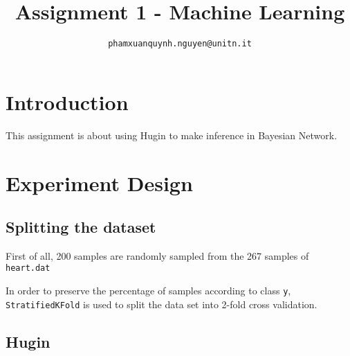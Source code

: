 \documentclass[conference]{IEEEtran}
\begin{document}
\title{Assignment 1 - Machine Learning}

\author{
	\texttt{phamxuanquynh.nguyen@unitn.it}
}

\maketitle

\acresetall

\section{Introduction}
\label{sec:introduction}
This assignment is about using Hugin to make inference in Bayesian Network.

\section{Experiment Design}
\subsection{Splitting the dataset}
First of all, 200 samples are randomly sampled from the 267 samples of \texttt{heart.dat}

In order to preserve the percentage of samples according to class \texttt{y},  \texttt{StratifiedKFold} is used to split the data set into 2-fold cross validation.

\subsection{Hugin}








\end{document}

